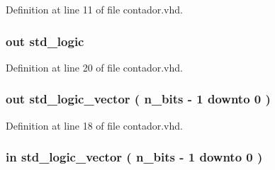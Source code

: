 Definition at line 11 of file contador.\+vhd.

\hypertarget{classcontador_a6fde1dafa392e429c8be2ce998a99f97}{}
\subsubsection[{comp}]{ {\bfseries \textcolor{keywordflow}{out}\textcolor{vhdlchar}{ }} {\bfseries \textcolor{comment}{std\+\_\+logic}\textcolor{vhdlchar}{ }} \hspace{0.3cm}{\ttfamily [Port]}}\label{classcontador_a6fde1dafa392e429c8be2ce998a99f97}


Definition at line 20 of file contador.\+vhd.

\hypertarget{classcontador_a4566909c8f114af9a0e58632500cd4e9}{}
\subsubsection[{count}]{ {\bfseries \textcolor{keywordflow}{out}\textcolor{vhdlchar}{ }} {\bfseries \textcolor{comment}{std\+\_\+logic\+\_\+vector}\textcolor{vhdlchar}{ }\textcolor{vhdlchar}{(}\textcolor{vhdlchar}{ }\textcolor{vhdlchar}{ }\textcolor{vhdlchar}{ }\textcolor{vhdlchar}{ }{\bfseries {\bf n\+\_\+bits}} \textcolor{vhdlchar}{-\/}\textcolor{vhdlchar}{ } \textcolor{vhdldigit}{1} \textcolor{vhdlchar}{ }\textcolor{keywordflow}{downto}\textcolor{vhdlchar}{ }\textcolor{vhdlchar}{ } \textcolor{vhdldigit}{0} \textcolor{vhdlchar}{ }\textcolor{vhdlchar}{)}\textcolor{vhdlchar}{ }} \hspace{0.3cm}{\ttfamily [Port]}}\label{classcontador_a4566909c8f114af9a0e58632500cd4e9}


Definition at line 18 of file contador.\+vhd.

\hypertarget{classcontador_a96447988f0843d79283d122598f5d510}{}
\subsubsection[{count\+\_\+comp}]{ {\bfseries \textcolor{keywordflow}{in}\textcolor{vhdlchar}{ }} {\bfseries \textcolor{comment}{std\+\_\+logic\+\_\+vector}\textcolor{vhdlchar}{ }\textcolor{vhdlchar}{(}\textcolor{vhdlchar}{ }\textcolor{vhdlchar}{ }\textcolor{vhdlchar}{ }\textcolor{vhdlchar}{ }{\bfseries {\bf n\+\_\+bits}} \textcolor{vhdlchar}{-\/}\textcolor{vhdlchar}{ } \textcolor{vhdldigit}{1} \textcolor{vhdlchar}{ }\textcolor{keywordflow}{downto}\textcolor{vhdlchar}{ }\textcolor{vhdlchar}{ } \textcolor{vhdldigit}{0} \textcolor{vhdlchar}{ }\textcolor{vhdlchar}{)}\textcolor{vhdlchar}{ }} \hspace{0.3cm}{\ttfamily [Port]}}\label{classcontador_a96447988f0843d79283d122598f5d510}


